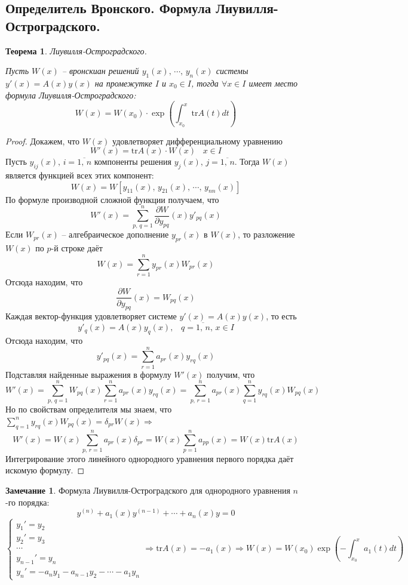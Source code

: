 \documentclass[a4paper,12pt]{article}
\theoremstyle{plain}
\newtheorem{theorem}{Теорема}[section]
\theoremstyle{definition}
\newtheorem*{note}{Замечание}
\theoremstyle{remark}
\begin{document}
\subsection{Определитель Вронского. Формула Лиувилля-Остроградского.}
\begin{theorem}
	Лиувилля-Остроградского.

	Пусть $W(x)$ -- вронскиан решений $y_1(x),\,\cdots,\,y_n(x)$ системы $y'(x) = A(x)y(x)$ на промежутке $I$ и $x_0 \in I$, тогда $\forall x \in I$ имеет место формула Лиувилля-Остроградского:
	\[W(x) = W(x_0) \cdot \exp\left(\int_{x_0}^x \text{tr}A(t)dt\right)\]
\end{theorem}

\begin{proof}
	Докажем, что $W(x)$ удовлетворяет дифференциальному уравнению
	\[W'(x) = \text{tr}A(x)\cdot W(x)\;\;\; x \in I\]
	Пусть $y_{ij}(x),\, i=\overline{1,\,n}$ компоненты решения $y_j(x),\, j=\overline{1,\,n}$. Тогда $W(x)$ является функцией всех этих компонент:
	\[W(x) = W[y_{11}(x),\,y_{21}(x),\,\cdots,\,y_{nn}(x)]\]
	По формуле производной сложной функции получаем, что
	\[W'(x) = \sum_{p,\,q = 1}^n \frac{\partial W}{\partial y_{pq}}(x)y'_{pq}(x)\]
	Если $W_{pr}(x)$ -- алгебраическое дополнение $y_{pr}(x)$ в $W(x)$, то разложение $W(x)$ по $p$-й строке даёт
	\[W(x) = \sum_{r = 1}^n y_{pr}(x)W_{pr}(x)\]
	Отсюда находим, что
	\[\frac{\partial W}{\partial y_{pq}}(x) = W_{pq}(x)\]
	Каждая вектор-функция удовлетворяет системе $y'(x) = A(x)y(x)$, то есть
	\[y'_q(x) = A(x)y_q(x),\;\;\; q=\overline{1,\,n},\, x \in I\]
	Отсюда находим, что
	\[y'_{pq}(x) = \sum_{r = 1}^n a_{pr}(x)y_{rq}(x)\]
	Подставляя найденные выражения в формулу $W'(x)$ получим, что
	\[W'(x) = \sum_{p,\,q = 1}^n W_{pq}(x)\sum_{r = 1}^n a_{pr}(x)y_{rq}(x) = \sum_{p,\,r = 1}^n a_{pr}(x) \sum_{q = 1}^n y_{rq}(x)W_{pq}(x)\]
	Но по свойствам определителя мы знаем, что
	$\sum_{q = 1}^n y_{rq}(x)W_{pq}(x) = \delta_{pr}W(x) \Rightarrow$
	\[W'(x) = W(x)\sum_{p,\,r = 1}^n a_{pr}(x) \delta_{pr} = W(x) \sum_{p = 1}^n a_{pp}(x) = W(x)\text{tr}A(x)\]
	Интегрирование этого линейного однородного уравнения первого порядка даёт искомую формулу.
\end{proof}

\begin{note}
	Формула Лиувилля-Остроградского для однородного уравнения $n$-го порядка:
	\[y^{(n)} + a_1(x)y^{(n-1)}+\cdots + a_n(x)y = 0\]
	\[\begin{cases}
			y_1' = y_2     \\
			y_2' = y_3     \\
			\cdots         \\
			y_{n-1}' = y_n \\
			y_n' = -a_ny_1 - a_{n-1}y_2 - \cdots - a_1y_n
		\end{cases} \Rightarrow \text{tr}A(x) = -a_1(x) \Rightarrow W(x) = W(x_0)\exp\left(-\int_{x_0}^x a_1(t)dt\right)\]
\end{note}
\end{document}
